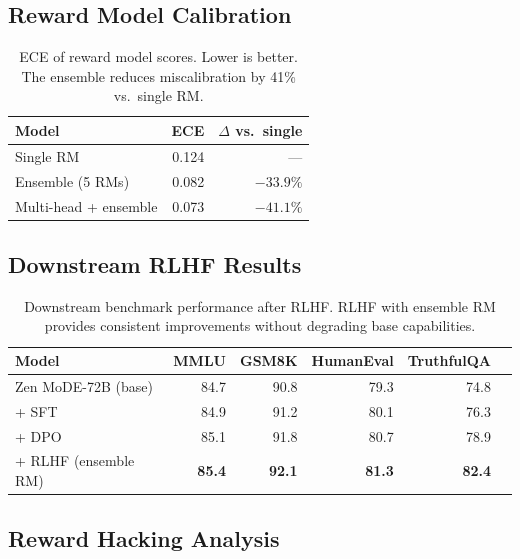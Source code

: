 \documentclass[11pt,a4paper]{article}
\begin{document}
\subsection{Reward Model Calibration}

\begin{table}[H]
\centering
\caption{ECE of reward model scores. Lower is better. The ensemble reduces
miscalibration by 41\% vs.\ single RM.}
\begin{tabular}{lrr}
\toprule
\textbf{Model} & \textbf{ECE} & \textbf{$\Delta$ vs.\ single} \\
\midrule
Single RM                & 0.124 & --- \\
Ensemble (5 RMs)         & 0.082 & $-33.9\%$ \\
Multi-head + ensemble    & 0.073 & $-41.1\%$ \\
\bottomrule
\end{tabular}
\label{tab:calibration}
\end{table}

\subsection{Downstream RLHF Results}

\begin{table}[H]
\centering
\caption{Downstream benchmark performance after RLHF. RLHF with ensemble RM provides
consistent improvements without degrading base capabilities.}
\begin{tabular}{lrrrrr}
\toprule
\textbf{Model} & \textbf{MMLU} & \textbf{GSM8K} & \textbf{HumanEval} & \textbf{TruthfulQA} \\
\midrule
Zen MoDE-72B (base)       & 84.7 & 90.8 & 79.3 & 74.8 \\
+ SFT                     & 84.9 & 91.2 & 80.1 & 76.3 \\
+ DPO                     & 85.1 & 91.8 & 80.7 & 78.9 \\
+ RLHF (ensemble RM)      & \textbf{85.4} & \textbf{92.1} & \textbf{81.3} & \textbf{82.4} \\
\bottomrule
\end{tabular}
\label{tab:downstream}
\end{table}

\subsection{Reward Hacking Analysis}
\end{document}
